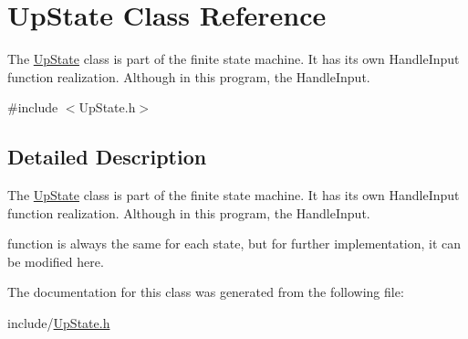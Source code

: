 \hypertarget{class_up_state}{}\section{Up\+State Class Reference}
\label{class_up_state}


The \mbox{\hyperlink{class_up_state}{Up\+State}} class is part of the finite state machine. It has its own Handle\+Input function realization. Although in this program, the Handle\+Input.  




{\ttfamily \#include $<$Up\+State.\+h$>$}



\subsection{Detailed Description}
The \mbox{\hyperlink{class_up_state}{Up\+State}} class is part of the finite state machine. It has its own Handle\+Input function realization. Although in this program, the Handle\+Input. 

function is always the same for each state, but for further implementation, it can be modified here. 

The documentation for this class was generated from the following file\+:\begin{DoxyCompactItemize}
\item 
include/\mbox{\hyperlink{_up_state_8h}{Up\+State.\+h}}\end{DoxyCompactItemize}
